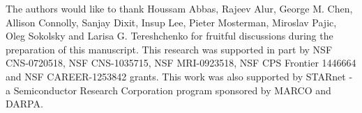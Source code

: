 \begin{acknowledgements}
The authors would like to thank Houssam Abbas, Rajeev Alur, George M. Chen, Allison Connolly, Sanjay Dixit, Insup Lee, Pieter Mosterman, Miroslav Pajic, Oleg Sokolsky and Larisa G. Tereshchenko for fruitful discussions during the preparation of this manuscript. This research was supported in part by NSF CNS-0720518, NSF CNS-1035715, NSF MRI-0923518, NSF CPS Frontier 1446664 and NSF CAREER-1253842 grants. This work was also supported by STARnet - a Semiconductor Research Corporation program sponsored by MARCO and DARPA.
\end{acknowledgements}
